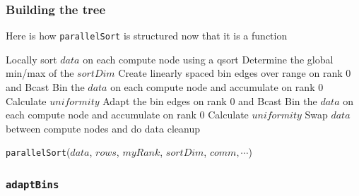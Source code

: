 \documentclass[usernames,dvipsnames]{beamer}
\begin{document}
\begin{frame}
	\frametitle{Building the tree}
	
	Here is how \texttt{parallelSort} is structured now that it is a function
	
	\vspace{10pt}
	
	\begin{algorithm}[H]
		\begin{algorithmic}[1]
			\STATE Locally sort $data$ on each compute node using a qsort
			\STATE Determine the global min/max of the $sortDim$
			\STATE Create linearly spaced bin edges over range on rank 0 and Bcast
			\STATE Bin the $data$ on each compute node and accumulate on rank 0
			\STATE Calculate $uniformity$
				\STATE Adapt the bin edges on rank 0 and Bcast
				\STATE Bin the $data$ on each compute node and accumulate on rank 0
				\STATE Calculate $uniformity$
			\ENDWHILE
			\STATE Swap $data$ between compute nodes and do data cleanup
		\end{algorithmic}
		\caption{\texttt{parallelSort}($data$, $rows$, $myRank$, $sortDim$, $comm, \cdots$)}
	\end{algorithm}
		
\end{frame}


\subsubsection{\texttt{adaptBins}}
\end{document}

